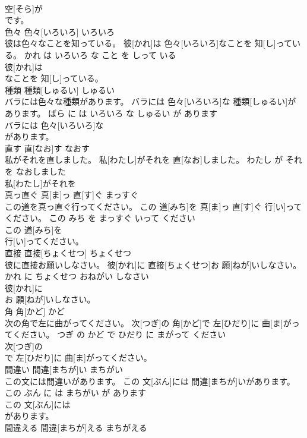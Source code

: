 \documentclass[8pt]{extreport}
\begin{document}
\begin{CJK}{UTF8}{min}
\\	空[そら]が
\\	です。			
\\	色々	色々[いろいろ]	いろいろ	
\\	彼は色々なことを知っている。	彼[かれ]は 色々[いろいろ]なことを 知[し]っている。	かれ は いろいろ な こと を しって いる	
\\	彼[かれ]は
\\	なことを 知[し]っている。			
\\	種類	種類[しゅるい]	しゅるい	
\\	バラには色々な種類があります。	バラには 色々[いろいろ]な 種類[しゅるい]があります。	ばら に は いろいろ な しゅるい が あります	
\\	バラには 色々[いろいろ]な
\\	があります。			
\\	直す	直[なお]す	なおす	
\\	私がそれを直しました。	私[わたし]がそれを 直[なお]しました。	わたし が それ を なおしました	
\\	私[わたし]がそれを
\\	真っ直ぐ	真[ま]っ 直[す]ぐ	まっすぐ	
\\	この道を真っ直ぐ行ってください。	この 道[みち]を 真[ま]っ 直[す]ぐ 行[い]ってください。	この みち を まっすぐ いって ください	
\\	この 道[みち]を
\\	行[い]ってください。			
\\	直接	直接[ちょくせつ]	ちょくせつ	
\\	彼に直接お願いしなさい。	彼[かれ]に 直接[ちょくせつ]お 願[ねが]いしなさい。	かれ に ちょくせつ おねがい しなさい	
\\	彼[かれ]に
\\	お 願[ねが]いしなさい。			
\\	角	角[かど]	かど	
\\	次の角で左に曲がってください。	次[つぎ]の 角[かど]で 左[ひだり]に 曲[ま]がってください。	つぎ の かど で ひだり に まがって ください	
\\	次[つぎ]の
\\	で 左[ひだり]に 曲[ま]がってください。			
\\	間違い	間違[まちが]い	まちがい	
\\	この文には間違いがあります。	この 文[ぶん]には 間違[まちが]いがあります。	この ぶん に は まちがい が あります	
\\	この 文[ぶん]には
\\	があります。			
\\	間違える	間違[まちが]える	まちがえる	

\end{CJK}
\end{document}
